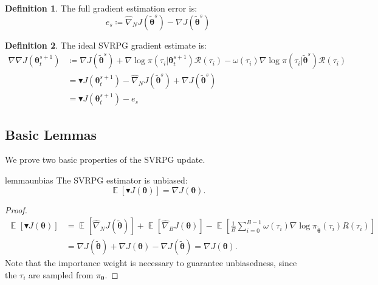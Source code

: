 \documentclass{article}
\theoremstyle{remark}
\theoremstyle{definition}
\newtheorem{definition}{Definition}[section]
\DeclareMathOperator*{\EV}{\mathbb{E}}
\newcommand{\EVV}[2][\ppvect \in \ppspace]{\EV_{#1}\left[{#2}\right]}
\newcommand{\dnabla}{\nabla\!\!\!\!\nabla}
\newcommand{\vtheta}{\boldsymbol{\theta}}
\newcommand{\Reward}{\mathcal{R}}
\newcommand{\score}[2]{\nabla\log\pi_{#1}(#2)}
\newcommand{\gradJ}[1]{\nabla J(#1)}
\newcommand{\gradApp}[2]{\widehat{\nabla}_{#2}J(#1)}
\newcommand{\gradBlack}[1]{\blacktriangledown J(#1)}
\newcommand{\gradIdeal}[1]{\dnabla J(#1)}
\begin{document}
\begin{definition}
The full gradient estimation error is:
\[
	e_s \coloneqq \gradApp{\tilde{\vtheta}^s}{N} - \gradJ{\tilde{\vtheta}^s} 
\]
\end{definition}

\begin{definition}\label{def:ideal}
The ideal SVRPG gradient estimate is:
\begin{align*}
	\gradIdeal{\vtheta_t^{s+1}} &\coloneqq 
	\gradJ{\tilde{\vtheta}^s}
	+ \nabla\log\pi(\tau_i \vert \vtheta_t^{s+1})\Reward(\tau_i) 
	- \omega(\tau_i)\nabla\log\pi(\tau_i \vert \tilde{\vtheta}^s)\Reward(\tau_i) \\
	&= \gradBlack{\vtheta_t^{s+1}} - \gradApp{\tilde{\vtheta}^s}{N} + \gradJ{\tilde{\vtheta}^s} \\
	&= \gradBlack{\vtheta_t^{s+1}} - e_s
\end{align*}
\end{definition}


\subsection*{Basic Lemmas}
We prove two basic properties of the SVRPG update.

\begin{restatable}{lemma}{unbias}\label{lemma:unbias}
The SVRPG estimator is unbiased:
\[
\mathop{\mathbb{E}}
\left[\blacktriangledown J(\vtheta)\right] = \gradJ{\vtheta}.
\]
\end{restatable}
\begin{proof}
\begin{align*}
\EVV[]{\gradBlack{\vtheta}} &= \EVV[]{\gradApp{\tilde{\vtheta}}{N}}  + \EVV[]{\gradApp{\vtheta}{B}} - \EVV[]{\frac{1}{B}\sum_{i=0}^{B-1}\omega(\tau_i)\score{\tilde{\vtheta}}{\tau_i}R(\tau_i)} \\
&= \gradJ{\tilde{\vtheta}} + \gradJ{\vtheta} - \gradJ{\tilde{\vtheta}} = \gradJ{\vtheta}.
\end{align*}
Note that the importance weight is necessary to guarantee unbiasedness, since the $\tau_i$ are sampled from $\pi_{\vtheta}$.
\end{proof}
\end{document}
